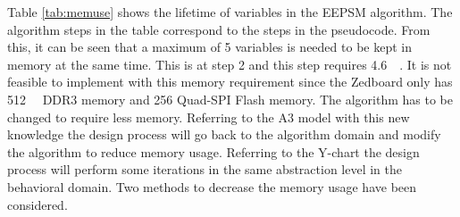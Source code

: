 Table \vref{tab:memuse} shows the lifetime of variables in the EEPSM algorithm. The algorithm steps in the table correspond to the steps in the pseudocode. From this, it can be seen that a maximum of 5 variables is needed to be kept in memory at the same time. This is at step 2 and this step requires \SI{4.6}{\giga\byte}. It is not feasible to implement with this memory requirement since the Zedboard only has \SI{512}{\mega\byte} DDR3 memory and 256 Quad-SPI Flash memory. The algorithm has to be changed to require less memory. Referring to the A$3$ model with this new knowledge the design process will go back to the algorithm domain and modify the algorithm to reduce memory usage. Referring to the Y-chart the design process will perform some iterations in the same abstraction level in the behavioral domain. Two methods to decrease the memory usage have been considered. \\

